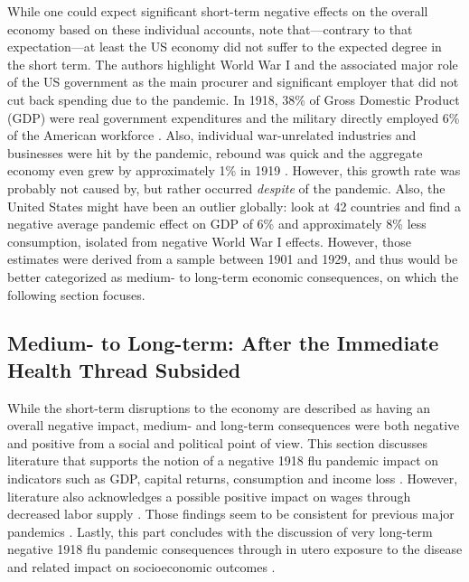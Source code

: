 \documentclass[12pt,a4paper]{article}
\begin{document}
While one could expect significant short-term negative effects on the overall economy based on these individual accounts, \cite{benmelech1918InfluenzaDid2020} note that---contrary to that expectation---at least the US economy did not suffer to the expected degree in the short term.
The authors highlight World War I and the associated major role of the US government as the main procurer and significant employer that did not cut back spending due to the pandemic.
In 1918, 38\% of Gross Domestic Product (GDP) were real government expenditures and the military directly employed 6\% of the American workforce \citep{benmelech1918InfluenzaDid2020}.
Also, individual war-unrelated industries and businesses were hit by the pandemic, rebound was quick and the aggregate economy even grew by approximately 1\% in 1919 \citep{romerWorldWarPostwar1988}.
However, this growth rate was probably not caused by, but rather occurred \textit{despite} of the pandemic.
Also, the United States might have been an outlier globally:
\cite{barroCoronavirusGreatInfluenza2020} look at 42 countries and find a negative average pandemic effect on GDP of 6\% and approximately 8\% less consumption, isolated from negative World War I effects.
However, those estimates were derived from a sample between 1901 and 1929, and thus would be better categorized as medium- to long-term economic consequences, on which the following section focuses.


\subsection{Medium- to Long-term: After the Immediate Health Thread Subsided} \label{sec:medlong}

While the short-term disruptions to the economy are described as having an overall negative impact, medium- and long-term consequences were both negative and positive from a social and political point of view.
This section discusses literature that supports the notion of a negative 1918 flu pandemic impact on indicators such as GDP, capital returns, consumption \citep{karlssonImpact1918Spanish2014, barroCoronavirusGreatInfluenza2020, correiaPandemicsDepressEconomy2020} and income loss \citep{fanInclusiveCostPandemic2016}.
However, literature also acknowledges a possible positive impact on wages through decreased labor supply \citep{brainerdEconomicEffects19182003}.
Those findings seem to be consistent for previous major pandemics \citep{jordaLongerrunEconomicConsequences2020}.
Lastly, this part concludes with the discussion of very long-term negative 1918 flu pandemic consequences through in utero exposure to the disease and related impact on socioeconomic outcomes \citep{almond1918InfluenzaPandemic2006}.
\end{document}
